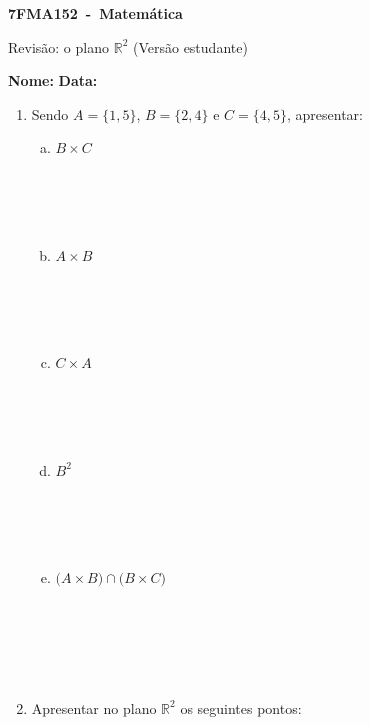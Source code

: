 \documentclass[a4paper,14pt]{article}
\begin{document}
	
	\noindent\textbf{7FMA152~-~Matemática} 
	
	\begin{center}Revisão: o plano $\mathbb{R}^2$ (Versão estudante)
	\end{center}
	
	
	\noindent\textbf{Nome:} \underline{\hspace{10cm}}
    \noindent\textbf{Data:} \underline{\hspace{4cm}}
	
	
	\begin{multicols}{2}
	    \begin{enumerate}
	    	\item Sendo $A = \{1, 5\}$, $B = \{2, 4\}$ e $C = \{4, 5\}$, apresentar:
	    	\begin{enumerate}[a)]
	    		\item $B \times C$ \\\\\\\\\\
	    		\item $A \times B$ \\\\\\\\\\
	    		\item $C \times A$ \\\\\\\\\\
	    		\item $B^2$ \\\\\\\\\\
	    		\item $\big(A \times B\big) \cap \big(B \times C\big)$ \\\\\\\\\\\\
	    	\end{enumerate}
    	    \item Apresentar no plano $\mathbb{R}^2$ os seguintes pontos:\\\\

\end{enumerate}
\end{multicols}
\end{document}
